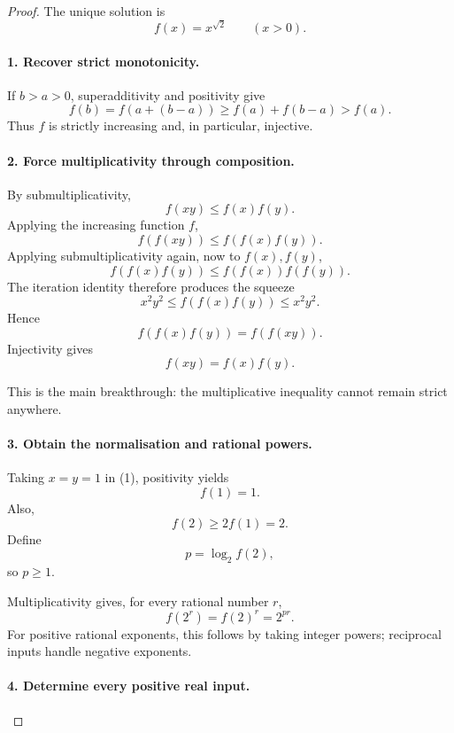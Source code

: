 
\begin{dlsummary}[title={\bfseries Solution 66. The Irrational Iteration Root},breakable]

\begin{proof}
The unique solution is
\[
\boxed{f(x)=x^{\sqrt2}\qquad(x>0).}
\]

\paragraph{1. Recover strict monotonicity.}

If \(b>a>0\), superadditivity and positivity give
\[
f(b)=f(a+(b-a))
\ge f(a)+f(b-a)>f(a).
\]
Thus \(f\) is strictly increasing and, in particular, injective.

\paragraph{2. Force multiplicativity through composition.}

By submultiplicativity,
\[
f(xy)\le f(x)f(y).
\]
Applying the increasing function \(f\),
\[
f(f(xy))\le f(f(x)f(y)).
\]
Applying submultiplicativity again, now to \(f(x),f(y)\),
\[
f(f(x)f(y))
\le f(f(x))f(f(y)).
\]
The iteration identity therefore produces the squeeze
\[
\boxed{
x^2y^2
\le f(f(x)f(y))
\le x^2y^2.
}
\]
Hence
\[
f(f(x)f(y))=f(f(xy)).
\]
Injectivity gives
\[
\boxed{f(xy)=f(x)f(y).} \tag{1}
\]

This is the main breakthrough: the multiplicative inequality cannot remain strict anywhere.

\paragraph{3. Obtain the normalisation and rational powers.}

Taking \(x=y=1\) in (1), positivity yields
\[
f(1)=1.
\]
Also,
\[
f(2)\ge2f(1)=2.
\]
Define
\[
p=\log_2 f(2),
\]
so \(p\ge1\).

Multiplicativity gives, for every rational number \(r\),
\[
\boxed{f(2^r)=f(2)^r=2^{pr}.} \tag{2}
\]
For positive rational exponents, this follows by taking integer powers; reciprocal inputs handle negative exponents.

\paragraph{4. Determine every positive real input.}


\end{proof}
\end{dlsummary}
